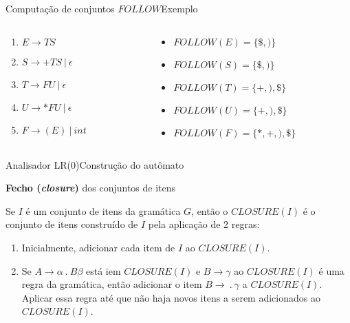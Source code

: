 \begin{frame}{Computação de conjuntos $FOLLOW$}{Exemplo}
    \begin{columns}
        \begin{column}{0.3\textwidth}
            \begin{enumerate}
              \item $E \rightarrow T S$

              \item $S \rightarrow + T S\ |\ \epsilon$

              \item $T \rightarrow F U\ |\ \epsilon$

              \item $U \rightarrow * F U\ |\ \epsilon$

              \item $F \rightarrow ( E )\ |\ int$
            \end{enumerate}
        \end{column}    
        \pause
        \begin{column}{0.7\textwidth}
            \begin{itemize}
                \item $FOLLOW(E) = \{\$, )\}$
                \item $FOLLOW(S) = \{\$, )\}$
		\item $FOLLOW(T) = \{+, ), \$ \}$
		\item $FOLLOW(U) = \{+, ), \$ \}$
                \item $FOLLOW(F) = \{*, +, ), \$\}$
            \end{itemize}
        \end{column}    
    \end{columns}
\end{frame}

\begin{frame}{Analisador LR(0)}{Construção do autômato}


 {\bf Fecho ({\it closure\/})} dos conjuntos de itens\\\bigskip

Se $I$ é um conjunto de itens da gramática $G$, então o
$CLOSURE(I)$ é o conjunto de itens construído de $I$
pela aplicação de 2 regras:

	\begin{enumerate}
		\item Inicialmente, adicionar cada item de $I$ ao $CLOSURE(I)$.
		\item Se $A\rightarrow \alpha\ .\ B\beta$ está iem $CLOSURE(I)$ e
		$B\rightarrow \gamma$ ao $CLOSURE(I)$ é uma regra da gramática, 
		então adicionar o item $B\rightarrow\ .\ \gamma$ a $CLOSURE(I)$.
		Aplicar essa regra até que não haja novos itens a serem
		adicionados ao $CLOSURE(I)$.
	\end{enumerate}

\end{frame}


